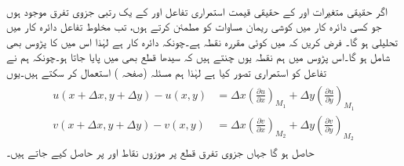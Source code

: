 \quad {}\\
اگر حقیقی متغیرات  اور  کے حقیقی قیمت استمراری تفاعل  اور  کے یک رتبی جزوی تفرق موجود ہوں جو کسی دائرہ کار  میں کوشی ریمان مساوات کو مطمئن کرتے ہوں، تب مخلوط تفاعل  دائرہ کار  میں تحلیلی ہو گا۔ 
فرض کریں کہ  میں  کوئی مقررہ نقطہ ہے۔چونکہ  دائرہ کار ہے لہٰذا اس میں  کا پڑوس بھی شامل ہو گا۔اس پڑوس میں ہم نقطہ  یوں چنتے ہیں کہ سیدھا قطع  بھی  میں پایا جاتا ہو۔چونکہ ہم نے تفاعل کو استمراری تصور کیا ہے لہٰذا ہم مسئلہ  (صفحہ ) استعمال کر سکتے ہیں۔یوں
\begin{gather}
\begin{aligned}\label{مساوات_مخلوط_کوشی_ریمان_مسئلہ_ثبوت_الف}
u(x+\Delta x,y+\Delta y)-u(x,y)&=\Delta x\left(\frac{\partial u}{\partial x}\right)_{M_1}+\Delta y\left(\frac{\partial u}{\partial y}\right)_{M_1}\\
v(x+\Delta x,y+\Delta y)-v(x,y)&=\Delta x\left(\frac{\partial v}{\partial x}\right)_{M_2}+\Delta y\left(\frac{\partial v}{\partial y}\right)_{M_2}
\end{aligned}
\end{gather}
حاصل ہو گا جہاں جزوی تفرق قطع  پر  موزوں نقاط  اور  پر حاصل کیے جاتے ہیں۔

